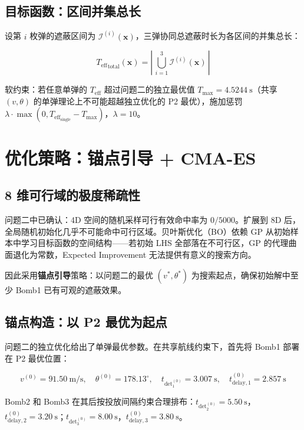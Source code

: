 \documentclass[12pt,a4paper]{ctexart}
\newcommand{\tdet}{t_{\text{det}}}
\newcommand{\Teff}{T_{\text{eff}}}
\begin{document}
\subsection{目标函数：区间并集总长}

设第 $i$ 枚弹的遮蔽区间为 $\mathcal{I}^{(i)}(\mathbf{x})$，三弹协同总遮蔽时长为各区间的并集总长：

\begin{equation}
\boxed{{\Teff}_{\text{total}}(\mathbf{x}) = \left|\,\bigcup_{i=1}^{3} \mathcal{I}^{(i)}(\mathbf{x})\,\right|}
\end{equation}

软约束：若任意单弹的 $\Teff$ 超过问题二的独立最优值 $T_{\max} = 4.5244\ \mathrm{s}$（共享 $(v,\theta)$ 的单弹理论上不可能超越独立优化的 P2 最优），施加惩罚 $\lambda \cdot \max(0, \Teff_{\text{single}} - T_{\max})$，$\lambda = 10$。

\section{优化策略：锚点引导 + CMA-ES}

\subsection{8 维可行域的极度稀疏性}

问题二中已确认：4D 空间的随机采样可行有效命中率为 $0/5000$。扩展到 8D 后，全局随机初始化几乎不可能命中可行区域。贝叶斯优化（BO）依赖 GP 从初始样本中学习目标函数的空间结构——若初始 LHS 全部落在不可行区，GP 的代理曲面退化为常数，Expected Improvement 无法提供有意义的搜索方向。

因此采用\textbf{锚点引导}策略：以问题二的最优 $(v^*, \theta^*)$ 为搜索起点，确保初始解中至少 Bomb1 已有可观的遮蔽效果。

\subsection{锚点构造：以 P2 最优为起点}

问题二的独立优化给出了单弹最优参数。在共享航线约束下，首先将 Bomb1 部署在 P2 最优位置：

\begin{equation}
\boxed{v^{(0)} = 91.50\ \mathrm{m/s},\quad \theta^{(0)} = 178.13^\circ,\quad \tdet_1^{(0)} = 3.007\ \mathrm{s},\quad t_{\text{delay},1}^{(0)} = 2.857\ \mathrm{s}}
\end{equation}

Bomb2 和 Bomb3 在其后按投放间隔约束合理排布：$\tdet_2^{(0)} = 5.50\ \mathrm{s}$，$t_{\text{delay},2}^{(0)} = 3.20\ \mathrm{s}$；$\tdet_3^{(0)} = 8.00\ \mathrm{s}$，$t_{\text{delay},3}^{(0)} = 3.80\ \mathrm{s}$。
\end{document}
